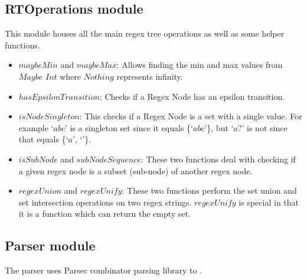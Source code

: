 \documentclass[letterpaper, 11pt]{article}
\begin{document}
\subsection{RTOperations module}\label{code:rtops}
This module houses all the main regex tree operations as well as some helper functions.
\begin{itemize}[itemsep=-0.3em]
    \item $maybeMin$ and $maybeMax$: Allows finding the min and max values from $Maybe$ $Int$ where $Nothing$ represents infinity.
    \item $hasEpsilonTransition$: Checks if a Regex Node has an epsilon transition.
    \item $isNodeSingleton$: This checks if a Regex Node is a set with a single value. For example `$abc$' is a singleton set since it equals \{`$abc$'\}, but `$a?$' is not since that equals \{`$a$', `$ $'\}.
    \item $isSubNode$ and $subNodeSequence$: These two functions deal with checking if a given regex node is a subset (sub-node) of another regex node.
    \item $regexUnion$ and $regexUnify$: These two functions perform the set union and set intersection operations on two regex strings. $regexUnify$ is special in that it is a function which can return the empty set.
\end{itemize}

\subsection{Parser module}\label{code:parse}
The parser uses Parsec combinator parsing library to .
\end{document}
